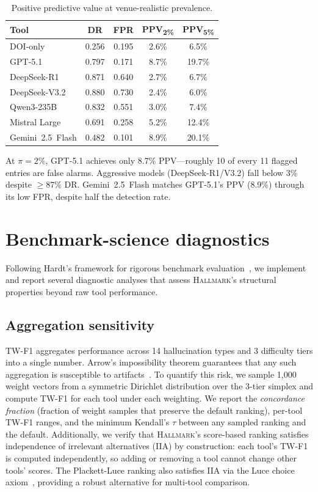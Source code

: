 \begin{table}[t]
\caption{Positive predictive value at venue-realistic prevalence.}
\label{tab:ppv}
\centering
\small
\begin{tabular}{lcccc}
\toprule
\textbf{Tool} & \textbf{DR} & \textbf{FPR} & \textbf{PPV\textsubscript{2\%}} & \textbf{PPV\textsubscript{5\%}} \\
\midrule
DOI-only         & 0.256 & 0.195 & 2.6\% & 6.5\% \\
GPT-5.1          & 0.797 & 0.171 & 8.7\% & 19.7\% \\
DeepSeek-R1      & 0.871 & 0.640 & 2.7\% & 6.7\% \\
DeepSeek-V3.2    & 0.880 & 0.730 & 2.4\% & 6.0\% \\
Qwen3-235B       & 0.832 & 0.551 & 3.0\% & 7.4\% \\
Mistral Large    & 0.691 & 0.258 & 5.2\% & 12.4\% \\
Gemini~2.5~Flash & 0.482 & 0.101 & 8.9\% & 20.1\% \\
\bottomrule
\end{tabular}
\end{table}

At $\pi{=}2\%$, GPT-5.1 achieves only 8.7\% PPV---roughly 10 of every 11 flagged entries are false alarms.
Aggressive models (DeepSeek-R1/V3.2) fall below 3\% despite ${\geq}87\%$ DR.
Gemini~2.5~Flash matches GPT-5.1's PPV (8.9\%) through its low FPR, despite half the detection rate.

\section{Benchmark-science diagnostics}
\label{app:benchmark_science}

Following Hardt's framework for rigorous benchmark evaluation~\citep{hardt2025benchmarks}, we implement and report several diagnostic analyses that assess \textsc{Hallmark}'s structural properties beyond raw tool performance.

\subsection{Aggregation sensitivity}
\label{app:aggregation_sensitivity}

TW-F1 aggregates performance across 14 hallucination types and 3 difficulty tiers into a single number.
Arrow's impossibility theorem guarantees that any such aggregation is susceptible to artifacts~\citep{arrow1950}.
To quantify this risk, we sample 1{,}000 weight vectors from a symmetric Dirichlet distribution over the 3-tier simplex and compute TW-F1 for each tool under each weighting.
We report the \emph{concordance fraction} (fraction of weight samples that preserve the default ranking), per-tool TW-F1 ranges, and the minimum Kendall's $\tau$ between any sampled ranking and the default.
Additionally, we verify that \textsc{Hallmark}'s score-based ranking satisfies independence of irrelevant alternatives (IIA) by construction: each tool's TW-F1 is computed independently, so adding or removing a tool cannot change other tools' scores.
The Plackett-Luce ranking also satisfies IIA via the Luce choice axiom~\citep{luce1959}, providing a robust alternative for multi-tool comparison.

